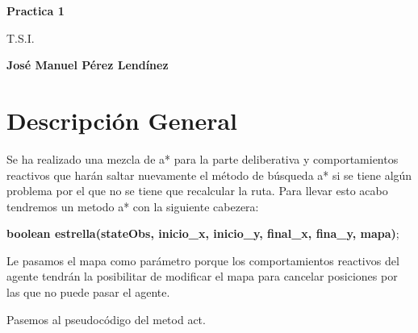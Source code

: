 \documentclass[titlepage]{article}
\begin{document}
	\begin{titlepage}
		\begin{center}
			\vspace*{1cm}
			\date{} %
			\Huge
			\textbf{Practica 1}
			
			\vspace{0.5cm}
			\LARGE
			T.S.I.
			
			\vspace{1.5cm}
			
			\textbf{José Manuel Pérez Lendínez}
			

			
		\end{center}
	\newpage
	\tableofcontents
	\newpage
	\end{titlepage}
	\section{Descripción General}
	Se ha realizado una mezcla de a* para la parte deliberativa y comportamientos reactivos que harán saltar nuevamente el método de búsqueda a* si se tiene algún problema por el que no se tiene que recalcular la ruta. Para llevar esto acabo tendremos un metodo a* con la siguiente cabezera:
	\newline
	
	\textbf{boolean estrella(stateObs, inicio\_x, inicio\_y, final\_x, fina\_y, mapa)};
	\newline
	
	Le pasamos el mapa como parámetro porque los comportamientos reactivos del agente tendrán la posibilitar de modificar el mapa para cancelar posiciones por las que no puede pasar el agente.
	
	Pasemos al pseudocódigo del metod act.
\end{document}
